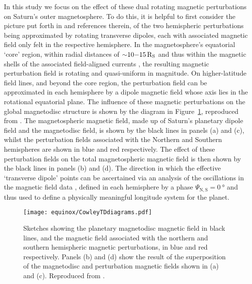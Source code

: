 In this study we focus on the effect of these dual rotating magnetic perturbations on Saturn's outer magnetosphere. To do this, it is helpful to first consider the picture put forth in \citet{andrews2010, provan2011} and references therein, of the two hemispheric perturbations being approximated by rotating transverse dipoles, each with associated magnetic field only felt in the respective hemisphere. In the magnetosphere's equatorial `core' region, within radial distances of ${\sim}10{\--}\SI{15}{R_S}$ and thus within the magnetic shells of the associated field-aligned currents \citep[e.g.][]{southwood2007}, the resulting magnetic perturbation field is rotating and quasi-uniform in magnitude. On higher-latitude field lines, and beyond the core region, the perturbation field can be approximated in each hemisphere by a dipole magnetic field whose axis lies in the rotational equatorial plane. The influence of these magnetic perturbations on the global magnetodisc structure is shown by the diagram in Figure~\ref{equinox:fig:CowleyTDdiagrams}, reproduced from \citet{cowley2017a}. The magnetospheric magnetic field, made up of Saturn's planetary dipole field and the magnetodisc field, is shown by the black lines in panels (a) and (c), whilst the perturbation fields associated with the Northern and Southern hemispheres are shown in blue and red respectively. The effect of these perturbation fields on the total magnetospheric magnetic field is then shown by the black lines in panels (b) and (d). The direction in which the effective `transverse dipole' points can be ascertained via an analysis of the oscillations in the magnetic field data \citep[e.g.][]{provan2009}, defined in each hemisphere by a phase $\Psi_\mathrm{N,S} = \SI{0}{\degree}$ and thus used to define a physically meaningful longitude system for the planet.
\begin{figure}
\centering
\texttt{[image: equinox/CowleyTDdiagrams.pdf]}
\caption[Sketches of hemispheric rotating magnetic perturbation fields, from \citet{cowley2017a}.]{Sketches showing the planetary magnetodisc magnetic field in black lines, and the magnetic field associated with the northern and southern hemispheric magnetic perturbations, in blue and red respectively. Panels (b) and (d) show the result of the superposition of the magnetodisc and perturbation magnetic fields shown in (a) and (c). Reproduced from \citet{cowley2017a}.}
\label{equinox:fig:CowleyTDdiagrams}
\end{figure}

